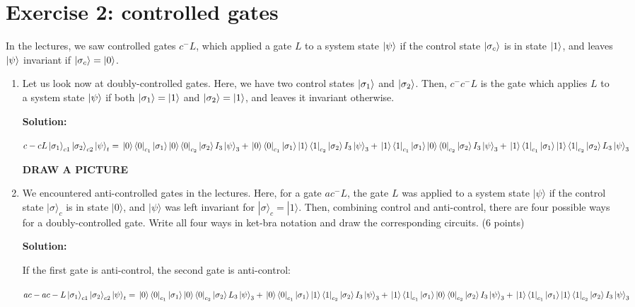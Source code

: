 \documentclass[12pt]{article}
\begin{document}
\section{Exercise 2: controlled gates}
In the lectures, we saw controlled gates $c^{-}L$, which applied a gate $L$ to a system state $\ket{\psi}$ if the control state $\ket{\sigma_c}$ is in state $\ket{1}$, and leaves $\ket{\psi}$ invariant if $\ket{\sigma_c} = \ket{0}$.
\begin{enumerate}
    \item Let us look now at doubly-controlled gates. Here, we have two control states $\ket{\sigma_1}$ and $\ket{\sigma_2}$. Then, $c^{-}c^{-}L$ is the gate which applies $L$ to a system state $\ket{\psi}$ if both $\ket{\sigma_1}=\ket{1}$ and $\ket{\sigma_2}=\ket{1}$, and leaves it invariant otherwise.


          \textbf{Solution:}


          $
              c-cL\ket{\sigma_1}_{c1}\ket{\sigma_2}_{c2}\ket{\psi}_t=
              \\\ket{0}\bra{0}_{c_1}\ket{\sigma_1}\ket{0}\bra{0}_{c_2}\ket{\sigma_2}I_3\ket{\psi}_3+
              \\\ket{0}\bra{0}_{c_1}\ket{\sigma_1}\ket{1}\bra{1}_{c_2}\ket{\sigma_2}I_3\ket{\psi}_3+
              \\\ket{1}\bra{1}_{c_1}\ket{\sigma_1}\ket{0}\bra{0}_{c_2}\ket{\sigma_2}I_3\ket{\psi}_3+
              \\\ket{1}\bra{1}_{c_1}\ket{\sigma_1}\ket{1}\bra{1}_{c_2}\ket{\sigma_2}L_3\ket{\psi}_3
          $


          \textbf{DRAW A PICTURE}

    \item We encountered anti-controlled gates in the lectures. Here, for a gate $ac^{-}L$, the gate $L$ was applied to a system state $|\psi\rangle$ if the control state $|\sigma\rangle_c$ is in state $|0\rangle$, and $|\psi\rangle$ was left invariant for $|\sigma\rangle_c = |1\rangle$. Then, combining control and anti-control, there are four possible ways for a doubly-controlled gate. Write all four ways in ket-bra notation and draw the corresponding circuits. (6 points)

          \textbf{Solution:}

          If the first gate is anti-control, the second gate is anti-control:

          $
              ac-ac-L\ket{\sigma_1}_{c1}\ket{\sigma_2}_{c2}\ket{\psi}_t=
              \\\ket{0}\bra{0}_{c_1}\ket{\sigma_1}\ket{0}\bra{0}_{c_2}\ket{\sigma_2}L_3\ket{\psi}_3+
              \\\ket{0}\bra{0}_{c_1}\ket{\sigma_1}\ket{1}\bra{1}_{c_2}\ket{\sigma_2}I_3\ket{\psi}_3+
              \\\ket{1}\bra{1}_{c_1}\ket{\sigma_1}\ket{0}\bra{0}_{c_2}\ket{\sigma_2}I_3\ket{\psi}_3+
              \\\ket{1}\bra{1}_{c_1}\ket{\sigma_1}\ket{1}\bra{1}_{c_2}\ket{\sigma_2}I_3\ket{\psi}_3
          $


\end{enumerate}
\end{document}
